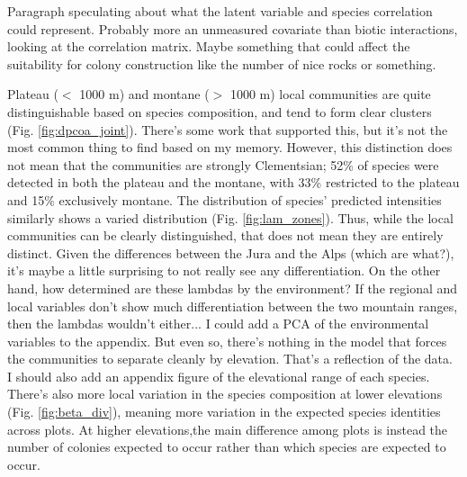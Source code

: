 \documentclass[preprint,final,times,12pt,3p]{elsarticle}
\begin{document}
Paragraph speculating about what the latent variable and species correlation could represent. Probably more an unmeasured covariate than biotic interactions, looking at the correlation matrix. Maybe something that could affect the suitability for colony construction like the number of nice rocks or something. 

Plateau ($<$ 1000 m) and montane ($>$ 1000 m) local communities are quite distinguishable based on species composition, and tend to form clear clusters (Fig. \ref{fig:dpcoa_joint}). There's some work that supported this, but it's not the most common thing to find based on my memory. However, this distinction does not mean that the communities are strongly Clementsian; 52\% of species were detected in both the plateau and the montane, with 33\% restricted to the plateau and 15\% exclusively montane. The distribution of species' predicted intensities similarly shows a varied distribution (Fig. \ref{fig:lam_zones}). Thus, while the local communities can be clearly distinguished, that does not mean they are entirely distinct. Given the differences between the Jura and the Alps (which are what?), it's maybe a little surprising to not really see any differentiation. On the other hand, how determined are these lambdas by the environment? If the regional and local variables don't show much differentiation between the two mountain ranges, then the lambdas wouldn't either... I could add a PCA of the environmental variables to the appendix. But even so, there's nothing in the model that forces the communities to separate cleanly by elevation. That's a reflection of the data. I should also add an appendix figure of the elevational range of each species. There's also more local variation in the species composition at lower elevations (Fig. \ref{fig:beta_div}), meaning more variation in the expected species identities across plots. At higher elevations,the main difference among plots is instead the number of colonies expected to occur rather than which species are expected to occur.
\end{document}
